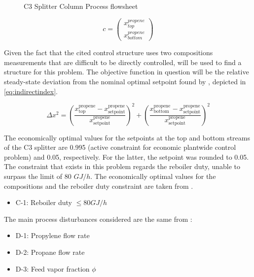 \documentclass[../../msc-thesis.tex]{subfiles}
\begin{document}
\begin{figure}[htb]
    \centering
    \caption{C3 Splitter Column Process flowsheet}
    \label{fig:c3splitterflowsheet}
\end{figure}

\begin{equation}
    c=\left(\begin{array}{c}
        {x_{top}^{propene}} \\
        {x_{bottom}^{propene}}
        \end{array}\right)
    \label{eq:setc3splitter}
\end{equation}

Given the fact that the cited control structure uses two compositions 
measurements that are difficult to be directly controlled, \mtc will be used 
to find a \soc structure for this problem. The objective function in question 
will be the relative steady-state deviation \cite{Hori2008} from the nominal 
optimal setpoint found by \textcite{Alves2018}, depicted in 
\autoref{eq:indirectindex}.

\begin{equation}
    \Delta x^2 = \left(\frac{x_{\text {top }}^{\mathrm{propene}} 
    -x_{\text {setpoint}}^{\mathrm{propene}}}
    {x_{\text {setpoint}}^{\mathrm{propene}}}\right)^{2}
    +\left(\frac{x_{\text {bottom }}^{\mathrm{propene}}
    -x_{\text {setpoint}}^{\mathrm{propene}}}
    {x_{\text {setpoint}}^{\mathrm{propene}}}\right)^{2}
    \label{eq:indirectindex}
\end{equation}

The economically optimal values for the setpoints at the top and bottom 
streams of the C3 splitter are 0.995 (active constraint for economic 
plantwide control problem) and 0.05, respectively. For the latter, the 
setpoint was rounded to 0.05. The constraint that exists in this problem 
regards the reboiler duty, unable to surpass the limit of 80 $GJ/h$. 
The economically optimal values for the compositions and the reboiler 
duty constraint are taken from \textcite{Alves2018}.

\begin{itemize}
    \item C-1: Reboiler duty $\leq 80 GJ/h $
\end{itemize}

The main process disturbances considered are the same from 
\textcite{Alves2018}:

\begin{itemize}
    \item D-1: Propylene flow rate
    \item D-2: Propane flow rate
    \item D-3: Feed vapor fraction $\phi$
\end{itemize}
\end{document}
